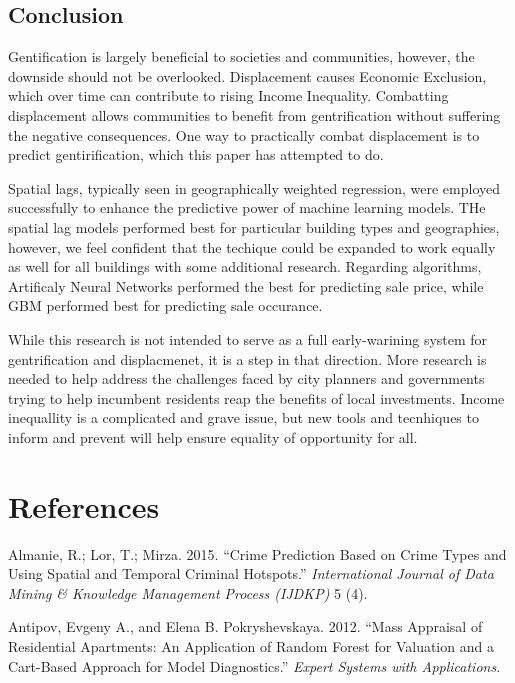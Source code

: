 \documentclass[12pt,]{article}
\begin{document}
\hypertarget{conclusion}{%
\subsection{Conclusion}\label{conclusion}}

Gentification is largely beneficial to societies and communities,
however, the downside should not be overlooked. Displacement causes
Economic Exclusion, which over time can contribute to rising Income
Inequality. Combatting displacement allows communities to benefit from
gentrification without suffering the negative consequences. One way to
practically combat displacement is to predict gentirification, which
this paper has attempted to do.

Spatial lags, typically seen in geographically weighted regression, were
employed successfully to enhance the predictive power of machine
learning models. THe spatial lag models performed best for particular
building types and geographies, however, we feel confident that the
techique could be expanded to work equally as well for all buildings
with some additional research. Regarding algorithms, Artificaly Neural
Networks performed the best for predicting sale price, while GBM
performed best for predicting sale occurance.

While this research is not intended to serve as a full early-warining
system for gentrification and displacmenet, it is a step in that
direction. More research is needed to help address the challenges faced
by city planners and governments trying to help incumbent residents reap
the benefits of local investments. Income inequallity is a complicated
and grave issue, but new tools and tecnhiques to inform and prevent will
help ensure equality of opportunity for all.

\newpage

\hypertarget{references}{%
\section*{References}\label{references}}

\hypertarget{refs}{}
\leavevmode\hypertarget{ref-Almanie2015}{}%
Almanie, R.; Lor, T.; Mirza. 2015. ``Crime Prediction Based on Crime
Types and Using Spatial and Temporal Criminal Hotspots.''
\emph{International Journal of Data Mining \& Knowledge Management
Process (IJDKP)} 5 (4).

\leavevmode\hypertarget{ref-antipov12}{}%
Antipov, Evgeny A., and Elena B. Pokryshevskaya. 2012. ``Mass Appraisal
of Residential Apartments: An Application of Random Forest for Valuation
and a Cart-Based Approach for Model Diagnostics.'' \emph{Expert Systems
with Applications}.
\end{document}
